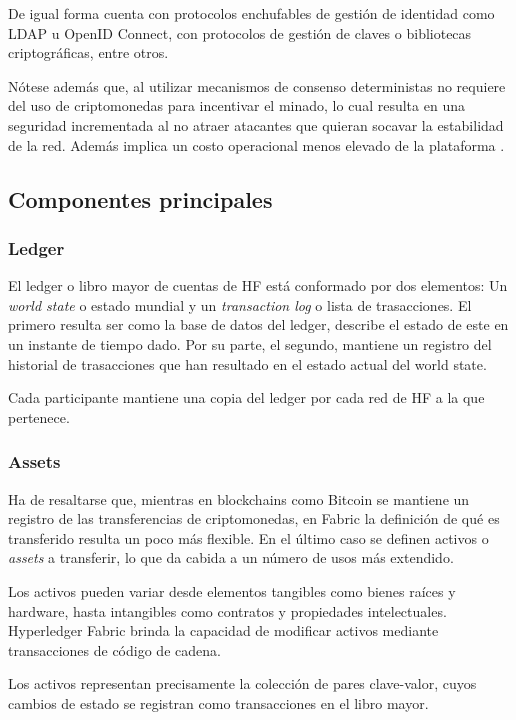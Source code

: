 De igual forma cuenta con protocolos enchufables de gesti\'on de identidad como LDAP u OpenID Connect, con protocolos de gesti\'on de claves o bibliotecas criptogr\'aficas, entre otros.

N\'otese adem\'as que, al utilizar mecanismos de consenso deterministas no requiere del uso de criptomonedas para incentivar el minado, lo cual resulta en una seguridad incrementada al no atraer atacantes que quieran socavar la estabilidad de la red. Adem\'as implica un costo operacional menos elevado de la plataforma .

\subsection{Componentes principales}

\subsubsection{Ledger}
El ledger o libro mayor de cuentas de HF est\'a conformado por dos elementos: Un \emph{world state} o estado mundial y un \emph{transaction log} o lista de trasacciones. El primero resulta ser como la base de datos del ledger, describe el estado de este en un instante de tiempo dado. Por su parte, el segundo, mantiene un registro del historial de trasacciones que han resultado en el estado actual del world state.

Cada participante mantiene una copia del ledger por cada red de HF a la que pertenece.

\subsubsection{Assets}
Ha de resaltarse que, mientras en blockchains como Bitcoin se mantiene un registro de las transferencias de criptomonedas, en Fabric la definici\'on de qu\'e es transferido resulta un poco m\'as flexible. En el \'ultimo caso se definen activos o \emph{assets} a transferir, lo que da cabida a un n\'umero de usos m\'as extendido.

Los activos pueden variar desde elementos tangibles como bienes ra\'ices y hardware, hasta intangibles como contratos y propiedades intelectuales. Hyperledger Fabric brinda la capacidad de modificar activos mediante transacciones de c\'odigo de cadena.

Los activos representan precisamente la colecci\'on de pares clave-valor, cuyos cambios de estado se registran como transacciones en el libro mayor.

